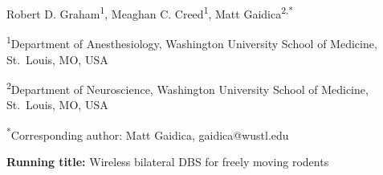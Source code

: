 \begin{center}
Robert D. Graham\textsuperscript{1}, Meaghan C. Creed\textsuperscript{1}, Matt Gaidica\textsuperscript{2,*}
\end{center}

\textsuperscript{1}Department of Anesthesiology, Washington University School of Medicine, St.~Louis, MO, USA

\textsuperscript{2}Department of Neuroscience, Washington University School of Medicine, St.~Louis, MO, USA

\textsuperscript{*}Corresponding author: Matt Gaidica, gaidica@wustl.edu

\textbf{Running title:} Wireless bilateral DBS for freely moving rodents
